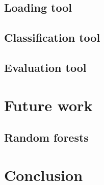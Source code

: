 \documentclass{article}
\begin{document}
    \subsection{Loading tool}
    \newpage
    \subsection{Classification tool}
    \newpage
    \subsection{Evaluation tool}
    \newpage
  \section{Future work}
    \subsection{Random forests}
    \newpage
  \section*{Conclusion}
\end{document}
